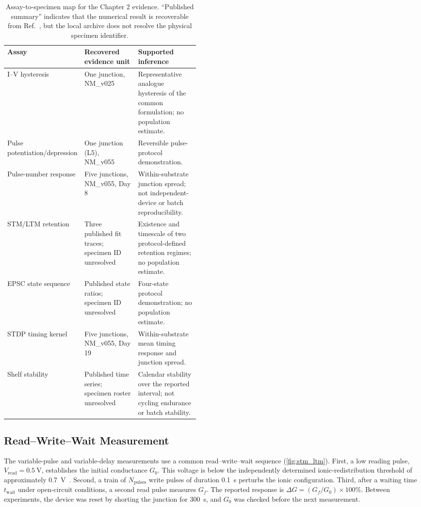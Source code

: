 \begin{table}[htbp]
  \centering
  \caption[Assay-to-specimen map for the proof-of-concept evidence]{Assay-to-specimen map for the Chapter 2 evidence. ``Published summary'' indicates that the numerical result is recoverable from Ref.~\cite{PradoSocorro2022}, but the local archive does not resolve the physical specimen identifier.}
  \label{tab:ch2_assay_specimens}
  \footnotesize
  \setlength{\tabcolsep}{3pt}
  \begin{tabularx}{\linewidth}{p{0.18\linewidth} p{0.28\linewidth} X}
    \toprule
    \textbf{Assay} & \textbf{Recovered evidence unit} & \textbf{Supported inference} \\
    \midrule
    I--V hysteresis & One junction, NM\_v025 & Representative analogue hysteresis of the common formulation; no population estimate. \\
    Pulse potentiation/depression & One junction (L5), NM\_v055 & Reversible pulse-protocol demonstration. \\
    Pulse-number response & Five junctions, NM\_v055, Day 8 & Within-substrate junction spread; not independent-device or batch reproducibility. \\
    STM/LTM retention & Three published fit traces; specimen ID unresolved & Existence and timescale of two protocol-defined retention regimes; no population estimate. \\
    EPSC state sequence & Published state ratios; specimen ID unresolved & Four-state protocol demonstration; no population estimate. \\
    STDP timing kernel & Five junctions, NM\_v055, Day 19 & Within-substrate mean timing response and junction spread. \\
    Shelf stability & Published time series; specimen roster unresolved & Calendar stability over the reported interval; not cycling endurance or batch stability. \\
    \bottomrule
  \end{tabularx}
\end{table}

\subsection{Read--Write--Wait Measurement}\label{app:ch2_read_write_wait}

The variable-pulse and variable-delay measurements use a common read--write--wait sequence (\cref{fig:stm_ltm}). First, a low reading pulse, \(V_{\mathrm{read}}=\SI{0.5}{\volt}\), establishes the initial conductance \(G_0\). This voltage is below the independently determined ionic-redistribution threshold of approximately \SI{0.7}{\volt}~\cite{PradoSocorro2022}. Second, a train of \(N_{\mathrm{pulses}}\) write pulses of duration \SI{0.1}{\second} perturbs the ionic configuration. Third, after a waiting time \(t_{\mathrm{wait}}\) under open-circuit conditions, a second read pulse measures \(G_f\). The reported response is \(\Delta G=(G_f/G_0)\times100\%\). Between experiments, the device was reset by shorting the junction for \SI{300}{\second}, and \(G_0\) was checked before the next measurement.

